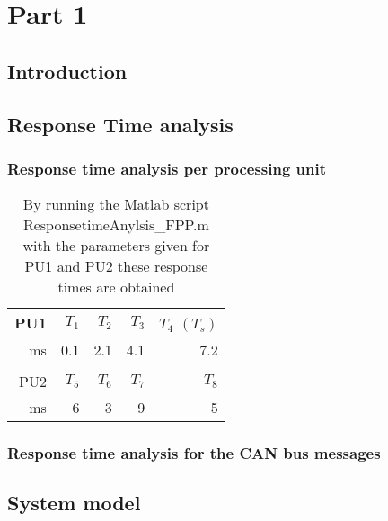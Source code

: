 \chapter{Part 1}

\section{Introduction}

\section{Response Time analysis}



\subsection{Response time analysis per processing unit}

\begin{table}[htbp]
	\centering
	\caption{By running the Matlab script ResponsetimeAnylsis\_FPP.m with the parameters given for PU1 and PU2 these response times are obtained}
	\begin{tabular}{rrrrr}
		\toprule
		PU1     & $T_1$    & $T_2$    & $T_3$    & $T_4$  $(T_s)$ \\
		\midrule
		ms      & 0.1     & 2.1     & 4.1     & 7.2 \\
		&         &         &         &  \\
		\toprule
		PU2     & $T_5$    & $T_6$    & $T_7$    & $T_8$ \\
		\midrule
		ms      & 6       & 3       & 9       & 5 \\
		
	\end{tabular}%
	\label{tab:addlabel}%
\end{table}%


\subsection{ Response time analysis for the CAN bus messages}

\section{System model}

